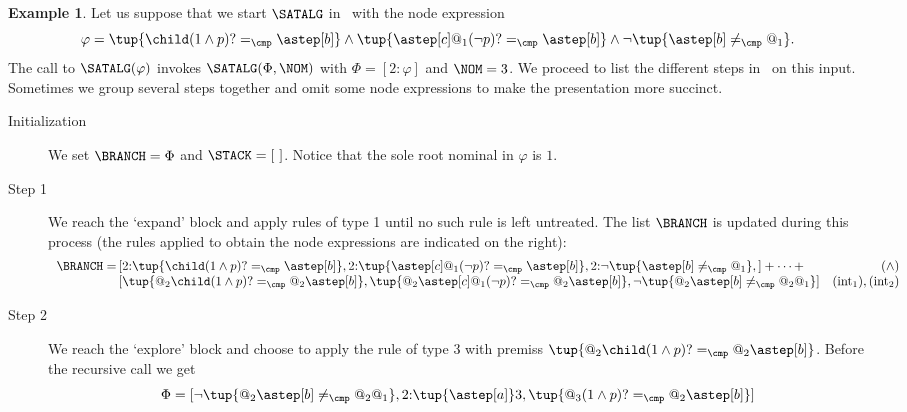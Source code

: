 \documentclass[10pt,a4paper]{amsart}
\theoremstyle{definition}
\newtheorem{exa}[thm]{Example}
\theoremstyle{remark}
\begin{document}
\begin{exa}
Let us suppose that we start $\SATALG$ in~ with the node expression
\[
    \varphi = \tup{\child(1\land p)? =_\cmp \astep[b]} \land \tup{\astep[c]@_1(\neg p)? =_\cmp \astep[b]}  \land \neg\tup{\astep[b]\neq_\cmp @_1}.
\]   
The call to $\SATALG(\varphi)$ invokes $\SATALG(\Phi,\NOM)$ with $\Phi=[2{:}\varphi]$ and  $\NOM=3$.
We proceed to list the different steps in~ on this input.
Sometimes we group several steps together and omit some node expressions to make the presentation more succinct. 

\begin{description}
  \item[Initialization] 
    We set $\BRANCH=\Phi$ and $\STACK=[~]$.
    Notice that the sole root nominal in $\varphi$ is $1$.

  \item[Step 1] 
    We reach the `expand' block and apply rules of type 1 until no such rule is left untreated.
    The list $\BRANCH$ is updated during this process (the rules applied to obtain the node expressions are indicated on the right):
    \[
      \begin{array}{r@{\,}@{}lr}
        \BRANCH =
          & [
              2{:}\tup{\child(1\land p)? =_\cmp \astep[b]},
              2{:}\tup{\astep[c]@_1(\neg p)? =_\cmp \astep[b]},
              2{:}\neg\tup{\astep[b]\neq_\cmp @_1},
          ] + \dots +
              & (\land) \\
          & [
              \tup{@_2\child(1\land p)? =_\cmp @_2\astep[b]},
              \tup{@_2\astep[c]@_1(\neg p)? =_\cmp @_2\astep[b]},
              \neg\tup{@_2\astep[b]\neq_\cmp @_2@_1}
            ]
              & (\text{int}_1), (\text{int}_2)
      \end{array}
    \]

  \item[Step 2]
    We reach the `explore' block and choose to apply the rule of type 3 with premiss $\tup{@_2\child(1\land p)? =_\cmp @_2\astep[b]}$.
    Before the recursive call we get
    \[
      \Phi =
        [
          \neg\tup{@_2\astep[b]\neq_\cmp @_2@_1}, 2{:}\tup{\astep[a]}3, \tup{@_3(1\land p)? =_\cmp @_2\astep[b]}
        ]
    \]


\end{description}
\end{exa}
\end{document}

